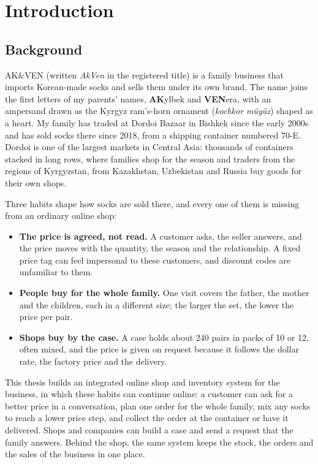 \chapter{Introduction}
\label{ch:intro}

\section{Background}

AK\&VEN (written \emph{AkVen} in the registered title) is a family business that imports Korean-made socks and
sells them under its own brand. The name joins the first letters of my parents' names, \textbf{AK}ylbek
and \textbf{VEN}era, with an ampersand drawn as the Kyrgyz ram's-horn ornament (\textit{kochkor müyüz}) shaped as a heart. My family has traded at Dordoi Bazaar in Bishkek since the
early 2000s and has sold socks there since 2018, from a shipping container numbered 70-E. Dordoi is one of the largest
markets in Central Asia: thousands of containers stacked in long rows, where families shop for the season and traders
from the regions of Kyrgyzstan, from Kazakhstan, Uzbekistan and Russia buy goods for their own shops.

Three habits shape how socks are sold there, and every one of them is missing from an ordinary online shop:
\begin{itemize}
	\item \textbf{The price is agreed, not read.} A customer asks, the seller answers, and the price moves with the
	quantity, the season and the relationship. A fixed price tag can feel impersonal to these
	customers, and discount codes are unfamiliar to them.
	\item \textbf{People buy for the whole family.} One visit covers the father, the mother and the children, each in
	a different size; the larger the set, the lower the price per pair.
	\item \textbf{Shops buy by the case.} A case holds about 240 pairs in packs of 10 or 12, often mixed, and the price
	is given on request because it follows the dollar rate, the factory price and the delivery.
\end{itemize}

This thesis builds an integrated online shop and inventory system for the business, in which these habits can continue
online: a customer can ask for a better price in a conversation, plan one order for the whole family, mix any socks to
reach a lower price step, and collect the order at the container or have it delivered. Shops and companies can build a
case and send a request that the family answers. Behind the shop, the same system keeps the stock, the orders and the
sales of the business in one place.

